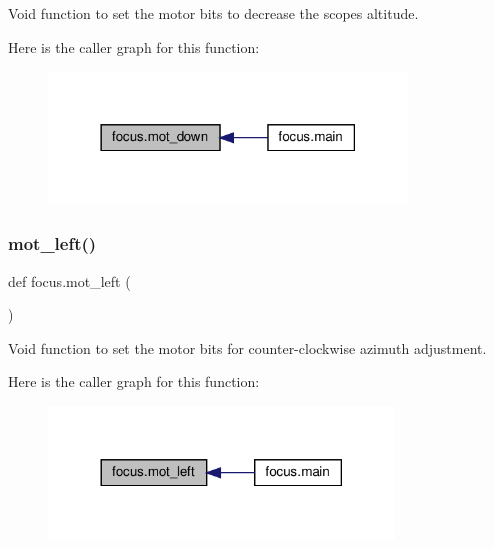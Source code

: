 Void function to set the motor bits to decrease the scope\textquotesingle{}s altitude. 

Here is the caller graph for this function\+:
\nopagebreak
\begin{figure}[H]
\begin{center}
\leavevmode
\includegraphics[width=270pt]{namespacefocus_ab92c9c6869b0af6ce3a5920ef8554190_icgraph}
\end{center}
\end{figure}
\mbox{\label{namespacefocus_ace370021c60f38a82ce96e69a482cbe3}} 
\subsubsection{\texorpdfstring{mot\+\_\+left()}{mot\_left()}}
{\footnotesize\ttfamily def focus.\+mot\+\_\+left (\begin{DoxyParamCaption}{ }\end{DoxyParamCaption})}



Void function to set the motor bits for counter-\/clockwise azimuth adjustment. 

Here is the caller graph for this function\+:
\nopagebreak
\begin{figure}[H]
\begin{center}
\leavevmode
\includegraphics[width=260pt]{namespacefocus_ace370021c60f38a82ce96e69a482cbe3_icgraph}
\end{center}
\end{figure}
\mbox{\label{namespacefocus_a9939d6f9388d8eb82625bd8e3af6f894}} 
